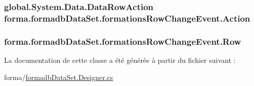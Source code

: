 \subsubsection[{\texorpdfstring{Action}{Action}}]{\setlength{\rightskip}{0pt plus 5cm}global.\+System.\+Data.\+Data\+Row\+Action forma.\+formadb\+Data\+Set.\+formations\+Row\+Change\+Event.\+Action\hspace{0.3cm}{\ttfamily [get]}}\hypertarget{classforma_1_1formadb_data_set_1_1formations_row_change_event_a1dd5b3f30634e98c83ccb267dd8c193f}{}\label{classforma_1_1formadb_data_set_1_1formations_row_change_event_a1dd5b3f30634e98c83ccb267dd8c193f}
\subsubsection[{\texorpdfstring{Row}{Row}}]{ forma.\+formadb\+Data\+Set.\+formations\+Row\+Change\+Event.\+Row\hspace{0.3cm}{\ttfamily [get]}}\hypertarget{classforma_1_1formadb_data_set_1_1formations_row_change_event_a3bea96189e1cd8f1ec3eead1b2ddfd82}{}\label{classforma_1_1formadb_data_set_1_1formations_row_change_event_a3bea96189e1cd8f1ec3eead1b2ddfd82}


La documentation de cette classe a été générée à partir du fichier suivant \+:\begin{DoxyCompactItemize}
\item 
forma/\hyperlink{formadb_data_set_8_designer_8cs}{formadb\+Data\+Set.\+Designer.\+cs}\end{DoxyCompactItemize}
